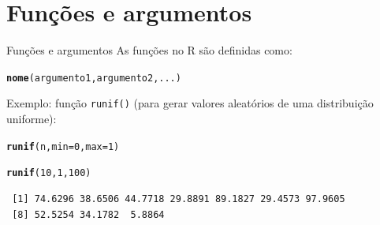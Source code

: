 \documentclass[10pt,handout]{beamer}\usepackage[]{graphicx}\usepackage[]{color}
\makeatletter
\newcommand{\hlnum}[1]{\textcolor[rgb]{0.686,0.059,0.569}{#1}}%
\newcommand{\hlstd}[1]{\textcolor[rgb]{0.345,0.345,0.345}{#1}}%
\newcommand{\hlkwc}[1]{\textcolor[rgb]{0.333,0.667,0.333}{#1}}%
\newcommand{\hlkwd}[1]{\textcolor[rgb]{0.737,0.353,0.396}{\textbf{#1}}}%
\newenvironment{kframe}{%
 \def\at@end@of@kframe{}%
 \ifinner\ifhmode%
  \def\at@end@of@kframe{\end{minipage}}%
  \begin{minipage}{\columnwidth}%
 \fi\fi%
 \def\FrameCommand##1{\hskip\@totalleftmargin \hskip-\fboxsep
 \colorbox{shadecolor}{##1}\hskip-\fboxsep
     \hskip-\linewidth \hskip-\@totalleftmargin \hskip\columnwidth}%
 \MakeFramed {\advance\hsize-\width
   \@totalleftmargin\z@ \linewidth\hsize
   \@setminipage}}%
 {\par\unskip\endMakeFramed%
 \at@end@of@kframe}
\newenvironment{knitrout}{}{} %
\makeatother
\begin{document}
\section{Funções e argumentos}

\begin{frame}[fragile]{Funções e argumentos}
As funções no R são definidas como:
\begin{knitrout}\small
{}\color{fgcolor}\begin{kframe}
\begin{alltt}
\hlkwd{nome}\hlstd{(argumento1, argumento2, ...)}
\end{alltt}
\end{kframe}
\end{knitrout}
Exemplo: função \verb|runif()| (para gerar valores aleatórios de uma
distribuição uniforme):
\begin{knitrout}\small
{}\color{fgcolor}\begin{kframe}
\begin{alltt}
\hlkwd{runif}\hlstd{(n,} \hlkwc{min} \hlstd{=} \hlnum{0}\hlstd{,} \hlkwc{max} \hlstd{=} \hlnum{1}\hlstd{)}
\end{alltt}
\end{kframe}
\end{knitrout}
\begin{knitrout}\small
{}\color{fgcolor}\begin{kframe}
\begin{alltt}
\hlkwd{runif}\hlstd{(}\hlnum{10}\hlstd{,} \hlnum{1}\hlstd{,} \hlnum{100}\hlstd{)}
\end{alltt}
\begin{verbatim}
 [1] 74.6296 38.6506 44.7718 29.8891 89.1827 29.4573 97.9605
 [8] 52.5254 34.1782  5.8864
\end{verbatim}
\end{kframe}
\end{knitrout}
\end{frame}
\end{document}
